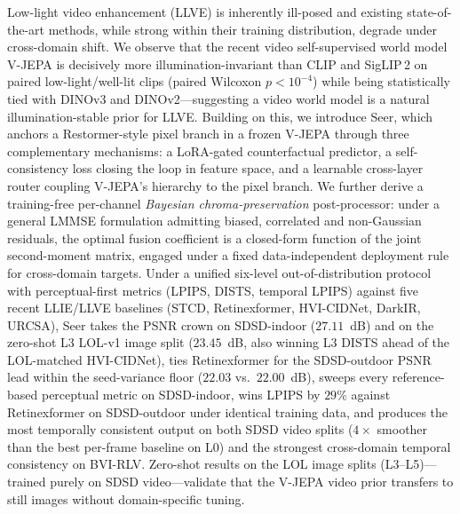 Low-light video enhancement (LLVE) is inherently ill-posed and existing state-of-the-art methods, while strong within their training distribution, degrade under cross-domain shift. We observe that the recent video self-supervised world model V-JEPA is decisively more illumination-invariant than CLIP and SigLIP\,2 on paired low-light/well-lit clips (paired Wilcoxon $p{<}10^{-4}$) while being statistically tied with DINOv3 and DINOv2---suggesting a video world model is a natural illumination-stable prior for LLVE. Building on this, we introduce Seer, which anchors a Restormer-style pixel branch in a frozen V-JEPA through three complementary mechanisms: a LoRA-gated counterfactual predictor, a self-consistency loss closing the loop in feature space, and a learnable cross-layer router coupling V-JEPA's hierarchy to the pixel branch. We further derive a training-free per-channel \emph{Bayesian chroma-preservation} post-processor: under a general LMMSE formulation admitting biased, correlated and non-Gaussian residuals, the optimal fusion coefficient is a closed-form function of the joint second-moment matrix, engaged under a fixed data-independent deployment rule for cross-domain targets. Under a unified six-level out-of-distribution protocol with perceptual-first metrics (LPIPS, DISTS, temporal LPIPS) against five recent LLIE/LLVE baselines (STCD, Retinexformer, HVI-CIDNet, DarkIR, URCSA), Seer takes the PSNR crown on SDSD-indoor ($27.11$~dB) and on the zero-shot L3 LOL-v1 image split ($23.45$~dB, also winning L3 DISTS ahead of the LOL-matched HVI-CIDNet), ties Retinexformer for the SDSD-outdoor PSNR lead within the seed-variance floor ($22.03$ vs.\ $22.00$~dB), sweeps every reference-based perceptual metric on SDSD-indoor, wins LPIPS by $29\%$ against Retinexformer on SDSD-outdoor under identical training data, and produces the most temporally consistent output on both SDSD video splits ($4{\times}$ smoother than the best per-frame baseline on L0) and the strongest cross-domain temporal consistency on BVI-RLV. Zero-shot results on the LOL image splits (L3--L5)---trained purely on SDSD video---validate that the V-JEPA video prior transfers to still images without domain-specific tuning.
